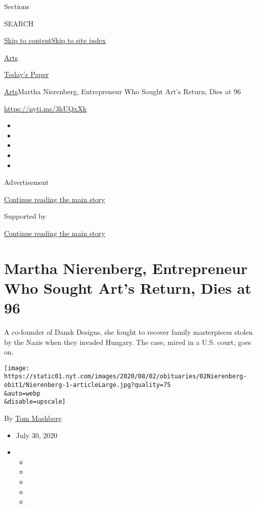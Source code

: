 Sections

SEARCH

\protect\hyperlink{site-content}{Skip to
content}\protect\hyperlink{site-index}{Skip to site index}

\href{https://www.nytimes.com/section/arts}{Arts}

\href{https://myaccount.nytimes.com/auth/login?response_type=cookie\&client_id=vi}{}

\href{https://www.nytimes.com/section/todayspaper}{Today's Paper}

\href{/section/arts}{Arts}\textbar{}Martha Nierenberg, Entrepreneur Who
Sought Art's Return, Dies at 96

\url{https://nyti.ms/3hUQxXk}

\begin{itemize}
\item
\item
\item
\item
\item
\end{itemize}

Advertisement

\protect\hyperlink{after-top}{Continue reading the main story}

Supported by

\protect\hyperlink{after-sponsor}{Continue reading the main story}

\hypertarget{martha-nierenberg-entrepreneur-who-sought-arts-return-dies-at-96}{%
\section{Martha Nierenberg, Entrepreneur Who Sought Art's Return, Dies
at
96}\label{martha-nierenberg-entrepreneur-who-sought-arts-return-dies-at-96}}

A co-founder of Dansk Designs, she fought to recover family masterpieces
stolen by the Nazis when they invaded Hungary. The case, mired in a U.S.
court, goes on.

\texttt{[image: https://static01.nyt.com/images/2020/08/02/obituaries/02Nierenberg-obit1/Nierenberg-1-articleLarge.jpg?quality=75\\\&auto=webp\\\&disable=upscale]}

By \href{https://www.nytimes.com/by/tom-mashberg}{Tom Mashberg}

\begin{itemize}
\item
  July 30, 2020
\item
  \begin{itemize}
  \item
  \item
  \item
  \item
  \item
  \end{itemize}
\end{itemize}

